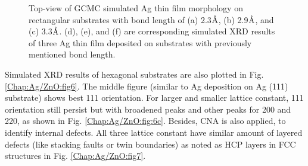 \begin{figure}[!ht]
  \label{Chap:Ag/ZnO:fig:8f}
\caption[GCMC simulation and simulated XRD results of Ag thin film morphology on rectangular substrates.]{Top-view of \ac{GCMC} simulated Ag thin film morphology on rectangular substrates with bond length of (a) 2.3$\mbox{\normalfont\AA}$, (b) 2.9$\mbox{\normalfont\AA}$, and (c) 3.3$\mbox{\normalfont\AA}$. (d), (e), and (f) are corresponding simulated \ac{XRD} results of three Ag thin film  deposited on substrates with previously mentioned bond length.}
  \label{Chap:Ag/ZnO:fig8}
\end{figure}
\endgroup



Simulated \ac{XRD} results of hexagonal substrates are also plotted in Fig. \ref{Chap:Ag/ZnO:fig6}. The middle figure (similar to Ag deposition on Ag (111) substrate) shows best {111} orientation. For larger and smaller lattice constant, {111} orientation still persist but with broadened peaks and other peaks for {200} and {220}, as shown in Fig. \ref{Chap:Ag/ZnO:fig:6c}. Besides, \acf{CNA} \cite{kelton1991crystal} is also applied, to identify internal defects. All three lattice constant have similar amount of layered defects (like stacking faults or twin boundaries) as noted as \ac{HCP} layers in \ac{FCC} structures in Fig. \ref{Chap:Ag/ZnO:fig7}.


